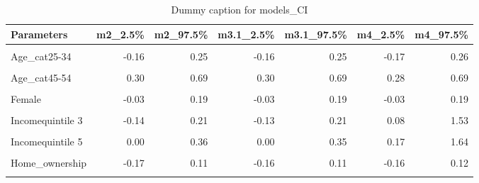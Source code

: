 \begin{table}
\centering
\caption{Dummy caption for models_CI}
\centering
\fontsize{10}{12}\selectfont
\begin{tabular}[t]{lrrrrrr}
\toprule
Parameters & m2\_2.5\% & m2\_97.5\% & m3.1\_2.5\% & m3.1\_97.5\% & m4\_2.5\% & m4\_97.5\%\\
\midrule
\cellcolor{gray!10}{(Intercept)} & \cellcolor{gray!10}{-3.77} & \cellcolor{gray!10}{-1.37} & \cellcolor{gray!10}{-3.38} & \cellcolor{gray!10}{-1.86} & \cellcolor{gray!10}{-4.13} & \cellcolor{gray!10}{-2.19}\\
Age\_cat25-34 & -0.16 & 0.25 & -0.16 & 0.25 & -0.17 & 0.26\\
\cellcolor{gray!10}{Age\_cat35-44} & \cellcolor{gray!10}{0.06} & \cellcolor{gray!10}{0.47} & \cellcolor{gray!10}{0.05} & \cellcolor{gray!10}{0.45} & \cellcolor{gray!10}{0.05} & \cellcolor{gray!10}{0.46}\\
Age\_cat45-54 & 0.30 & 0.69 & 0.30 & 0.69 & 0.28 & 0.69\\
\cellcolor{gray!10}{Age\_cat55+} & \cellcolor{gray!10}{0.79} & \cellcolor{gray!10}{1.13} & \cellcolor{gray!10}{0.78} & \cellcolor{gray!10}{1.13} & \cellcolor{gray!10}{0.79} & \cellcolor{gray!10}{1.14}\\
Female & -0.03 & 0.19 & -0.03 & 0.19 & -0.03 & 0.19\\
\cellcolor{gray!10}{Incomequintile 2} & \cellcolor{gray!10}{-0.21} & \cellcolor{gray!10}{0.15} & \cellcolor{gray!10}{-0.21} & \cellcolor{gray!10}{0.14} & \cellcolor{gray!10}{-0.70} & \cellcolor{gray!10}{0.83}\\
Incomequintile 3 & -0.14 & 0.21 & -0.13 & 0.21 & 0.08 & 1.53\\
\cellcolor{gray!10}{Incomequintile 4} & \cellcolor{gray!10}{-0.04} & \cellcolor{gray!10}{0.30} & \cellcolor{gray!10}{-0.04} & \cellcolor{gray!10}{0.30} & \cellcolor{gray!10}{0.19} & \cellcolor{gray!10}{1.65}\\
Incomequintile 5 & 0.00 & 0.36 & 0.00 & 0.35 & 0.17 & 1.64\\
\cellcolor{gray!10}{Higher\_edu} & \cellcolor{gray!10}{0.02} & \cellcolor{gray!10}{0.25} & \cellcolor{gray!10}{0.02} & \cellcolor{gray!10}{0.25} & \cellcolor{gray!10}{0.02} & \cellcolor{gray!10}{0.24}\\
Home\_ownership & -0.17 & 0.11 & -0.16 & 0.11 & -0.16 & 0.12\\
\cellcolor{gray!10}{Dwelling\_house} & \cellcolor{gray!10}{-0.12} & \cellcolor{gray!10}{0.16} & \cellcolor{gray!10}{-0.12} & \cellcolor{gray!10}{0.16} & \cellcolor{gray!10}{-0.12} & \cellcolor{gray!10}{0.17}\\

\end{tabular}
\end{table}
